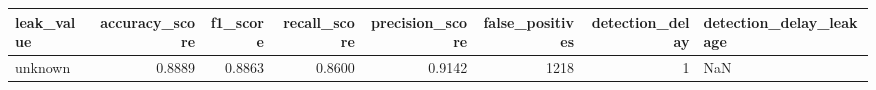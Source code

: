 \begin{tabular}{lrrrrrrl}
\toprule
leak\_value & accuracy\_score & f1\_score & recall\_score & precision\_score & false\_positives & detection\_delay & detection\_delay\_leakage \\
\midrule
unknown & 0.8889 & 0.8863 & 0.8600 & 0.9142 & 1218 & 1 & NaN \\
\bottomrule
\end{tabular}
